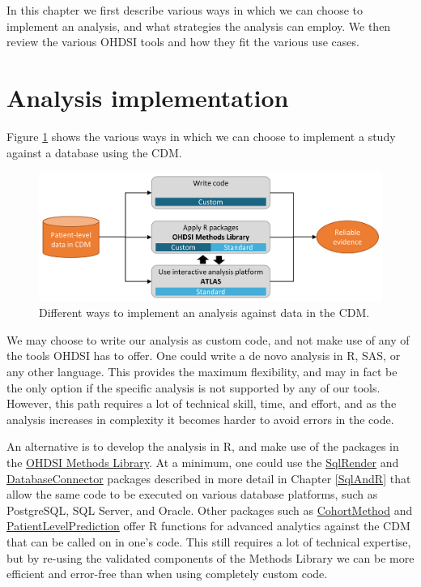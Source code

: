 \documentclass[11pt]{book}
\theoremstyle{definition}
\theoremstyle{definition}
\theoremstyle{definition}
\theoremstyle{remark}
\begin{document}
In this chapter we first describe various ways in which we can choose to implement an analysis, and what strategies the analysis can employ. We then review the various OHDSI tools and how they fit the various use cases.

\hypertarget{analysisImplementation}{%
\section{Analysis implementation}\label{analysisImplementation}}

Figure \ref{fig:implementations} shows the various ways in which we can choose to implement a study against a database using the CDM.

\begin{figure}

{\centering \includegraphics[width=0.9\linewidth]{images/OhdsiAnalyticsTools/implementations} 

}

\caption{Different ways to implement an analysis against data in the CDM.}\label{fig:implementations}
\end{figure}

We may choose to write our analysis as custom code, and not make use of any of the tools OHDSI has to offer. One could write a de novo analysis in R, SAS, or any other language. This provides the maximum flexibility, and may in fact be the only option if the specific analysis is not supported by any of our tools. However, this path requires a lot of technical skill, time, and effort, and as the analysis increases in complexity it becomes harder to avoid errors in the code.

An alternative is to develop the analysis in R, and make use of the packages in the \href{https://ohdsi.github.io/MethodsLibrary/}{OHDSI Methods Library}. At a minimum, one could use the \href{https://ohdsi.github.io/SqlRender/}{SqlRender} and \href{https://ohdsi.github.io/DatabaseConnector/}{DatabaseConnector} packages described in more detail in Chapter \ref{SqlAndR} that allow the same code to be executed on various database platforms, such as PostgreSQL, SQL Server, and Oracle. Other packages such as \href{https://ohdsi.github.io/CohortMethod/}{CohortMethod} and \href{https://ohdsi.github.io/PatientLevelPrediction/}{PatientLevelPrediction} offer R functions for advanced analytics against the CDM that can be called on in one's code. This still requires a lot of technical expertise, but by re-using the validated components of the Methods Library we can be more efficient and error-free than when using completely custom code.
\end{document}
